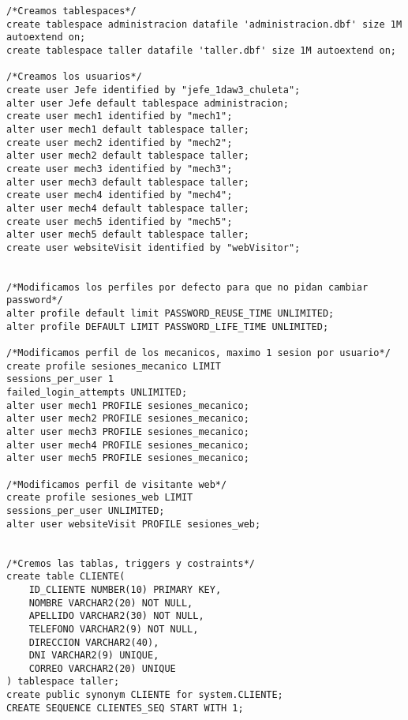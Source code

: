 \begin{lstlisting}[caption=Script .sql para crear la BD (BBDD)]
    /*Creamos tablespaces*/
create tablespace administracion datafile 'administracion.dbf' size 1M autoextend on;
create tablespace taller datafile 'taller.dbf' size 1M autoextend on;

/*Creamos los usuarios*/
create user Jefe identified by "jefe_1daw3_chuleta";
alter user Jefe default tablespace administracion;
create user mech1 identified by "mech1";
alter user mech1 default tablespace taller;
create user mech2 identified by "mech2";
alter user mech2 default tablespace taller;
create user mech3 identified by "mech3";
alter user mech3 default tablespace taller;
create user mech4 identified by "mech4";
alter user mech4 default tablespace taller;
create user mech5 identified by "mech5";
alter user mech5 default tablespace taller;
create user websiteVisit identified by "webVisitor";


/*Modificamos los perfiles por defecto para que no pidan cambiar password*/
alter profile default limit PASSWORD_REUSE_TIME UNLIMITED;
alter profile DEFAULT LIMIT PASSWORD_LIFE_TIME UNLIMITED;

/*Modificamos perfil de los mecanicos, maximo 1 sesion por usuario*/
create profile sesiones_mecanico LIMIT
sessions_per_user 1
failed_login_attempts UNLIMITED;
alter user mech1 PROFILE sesiones_mecanico;
alter user mech2 PROFILE sesiones_mecanico;
alter user mech3 PROFILE sesiones_mecanico;
alter user mech4 PROFILE sesiones_mecanico;
alter user mech5 PROFILE sesiones_mecanico;

/*Modificamos perfil de visitante web*/
create profile sesiones_web LIMIT
sessions_per_user UNLIMITED;
alter user websiteVisit PROFILE sesiones_web;


/*Cremos las tablas, triggers y costraints*/
create table CLIENTE(
    ID_CLIENTE NUMBER(10) PRIMARY KEY,
    NOMBRE VARCHAR2(20) NOT NULL,
    APELLIDO VARCHAR2(30) NOT NULL,
    TELEFONO VARCHAR2(9) NOT NULL,
    DIRECCION VARCHAR2(40),
    DNI VARCHAR2(9) UNIQUE,
    CORREO VARCHAR2(20) UNIQUE
) tablespace taller;
create public synonym CLIENTE for system.CLIENTE;
CREATE SEQUENCE CLIENTES_SEQ START WITH 1;


\end{lstlisting}

